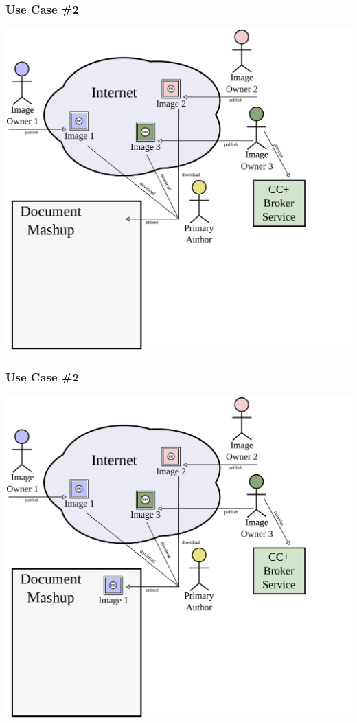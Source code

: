 \documentclass[mathserif,xcolor=dvipsnames,hyperref={bookmarks=true}]{beamer}
\begin{document}
    \begin{frame}[t]
        \frametitle{Use Case \#2}
        \begin{center}
            \includegraphics[width=0.9\textheight]{../resources/usecases/usecase2/usecase2-step18.pdf}
        \end{center}
    \end{frame}
    \begin{frame}[t]
        \frametitle{Use Case \#2}
        \begin{center}
            \includegraphics[width=0.9\textheight]{../resources/usecases/usecase2/usecase2-step19.pdf}
        \end{center}
    \end{frame}
\end{document}
